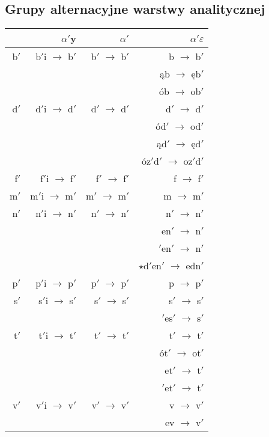 \documentclass{article}
\begin{document}
\subsection{Grupy alternacyjne warstwy analitycznej}

\begin{longtable}{r|rrr}
 & \boldmath$\alpha'${\bf y} & \boldmath$\alpha'$ & \boldmath$\alpha'\varepsilon$\\
\hline
b$'$ & b$'$i $\rightarrow$ b$'$ & b$'$ $\rightarrow$ b$'$ & b $\rightarrow$ b$'$\\
 &  &  & ąb $\rightarrow$ ęb$'$\\
 &  &  & ób $\rightarrow$ ob$'$\\
\hline
d$'$ & d$'$i $\rightarrow$ d$'$ & d$'$ $\rightarrow$ d$'$ & d$'$ $\rightarrow$ d$'$\\
 &  &  & ód$'$ $\rightarrow$ od$'$\\
 &  &  & ąd$'$ $\rightarrow$ ęd$'$\\
 &  &  & óz$'$d$'$ $\rightarrow$ oz$'$d$'$\\
\hline
f$'$ & f$'$i $\rightarrow$ f$'$ & f$'$ $\rightarrow$ f$'$ & f $\rightarrow$ f$'$\\
\hline
m$'$ & m$'$i $\rightarrow$ m$'$ & m$'$ $\rightarrow$ m$'$ & m $\rightarrow$ m$'$\\
\hline
n$'$ & n$'$i $\rightarrow$ n$'$ & n$'$ $\rightarrow$ n$'$ & n$'$ $\rightarrow$ n$'$\\
 &  &  & en$'$ $\rightarrow$ n$'$\\
 &  &  & $'$en$'$ $\rightarrow$ n$'$\\
 &  &  & $\star$d$'$en$'$ $\rightarrow$ edn$'$\\
\hline
p$'$ & p$'$i $\rightarrow$ p$'$ & p$'$ $\rightarrow$ p$'$ & p $\rightarrow$ p$'$\\
\hline
s$'$ & s$'$i $\rightarrow$ s$'$ & s$'$ $\rightarrow$ s$'$ & s$'$ $\rightarrow$ s$'$\\
 &  &  & $'$es$'$ $\rightarrow$ s$'$\\
\hline
t$'$ & t$'$i $\rightarrow$ t$'$ & t$'$ $\rightarrow$ t$'$ & t$'$ $\rightarrow$ t$'$\\
 &  &  & ót$'$ $\rightarrow$ ot$'$\\
 &  &  & et$'$ $\rightarrow$ t$'$\\
 &  &  & $'$et$'$ $\rightarrow$ t$'$\\
\hline
v$'$ & v$'$i $\rightarrow$ v$'$ & v$'$ $\rightarrow$ v$'$ & v $\rightarrow$ v$'$\\
 &  &  & ev $\rightarrow$ v$'$\\

\end{longtable}
\end{document}
